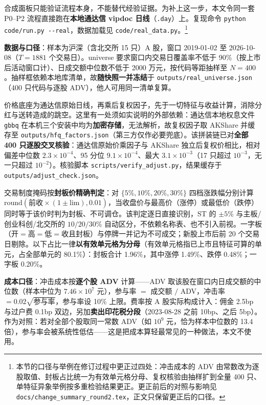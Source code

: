 合成面板只能验证流程本身，不能替代经验证据。为补上这一步，本文令同一套 P0--P2 流程直接跑在\textbf{本地通达信 vipdoc 日线}（\texttt{.day}）上。复现命令 \texttt{python code/run.py {-}{-}real}，数据加载见 \texttt{code/real\_data.py}。\footnote{本节的口径与举例在修订过程中更正过四处：冲击成本的 ADV 由常数改为逐股取值、封板占比统一为有效单元格分母、复权核验由抽样扩到全量 400 只、单特征异象举例按多重检验结果更正。更正前后的对照与影响见 \texttt{docs/change\_summary\_round2.tex}，正文只保留更正后的口径。}

\textbf{数据与口径}：样本为沪深（含北交所 15 只）A 股，窗口 2019-01-02 至 2026-10-08（$T=1881$ 个交易日）。universe 要求窗口内交易日覆盖率不低于 90\%（按上市后活动窗口计）、日成交额中位数不低于 2000 万元，按代码等距抽样至 $N=400$。抽样框依赖本地库清单，故\textbf{随快照一并冻结}于 \texttt{outputs/real\_universe.json}（400 只代码与逐股 ADV），他人可用同一清单复算。

价格底座为通达信原始日线，再乘后复权因子，先于一切特征与收益计算，消除分红与送转造成的跳空。这里有一处须如实说明的外部依赖：通达信本地权息文件 \texttt{gbbq} 在本机三个安装中均为\textbf{加密存储}，无法解析，故复权因子取 AKShare 并缓存至 \texttt{outputs/hfq\_factors.json}（第三方仅作必要兜底）。该拼装链已对\textbf{全部 400 只逐股交叉核验}：通达信原始价乘因子与 AKShare 独立后复权价相比，相对偏差中位数 $2.3\times10^{-4}$、95 分位 $9.1\times10^{-4}$、最大 $3.1\times10^{-3}$（17 只超过 $10^{-3}$，无一只超过 $10^{-2}$）。核验脚本 \texttt{scripts/verify\_adjust.py}，结果缓存于 \texttt{outputs/adjust\_check.json}。

交易制度掩码按\textbf{封板价精确判定}：对 $\{5\%,10\%,20\%,30\%\}$ 四档涨跌幅分别计算 $\text{round}(\text{前收}\times(1\pm\text{lim}),0.01)$，当收盘价与最高价（涨停）或最低价（跌停）同时等于该价时判为封板、不可调仓。该判定逐日直接识别，ST 的 $\pm5\%$ 与主板/创业科创/北交所的 $10/20/30\%$ 自动区分，不依赖名称表、也不引入前视。一字板（开$=$高$=$低$=$收且封板）与停牌一并记为不可成交；新股上市后前 20 个交易日剔除。以下占比一律\textbf{以有效单元格为分母}（有效单元格指已上市且特征可算的单元，占全部单元的 80.1\%）：封板合计 1.96\%，其中涨停 1.49\%、跌停 0.48\%；一字板 0.20\%。

\textbf{成本口径}：冲击成本按\textbf{逐个股 ADV} 计算——ADV 取该股在窗口内日成交额的中位数（样本中位为 $7.46\times10^7$ 元），参与率 $=$ 成交额 $/$ ADV，冲击率 $=0.02\sqrt{\text{参与率}}$，参与率设 10\% 上限。费率按 A 股实际构成计入：佣金 2.5bp 与过户费 0.1bp 双边，另加\textbf{卖出印花税分段}（2023-08-28 之前 10bp、之后 5bp）。作为对照：若对全部个股取同一常数 ADV（如 $10^9$ 元，恰为样本中位数的 13.4 倍），参与率会被系统性低估——这是把成本算轻最常见的一种做法，本文不使用。

